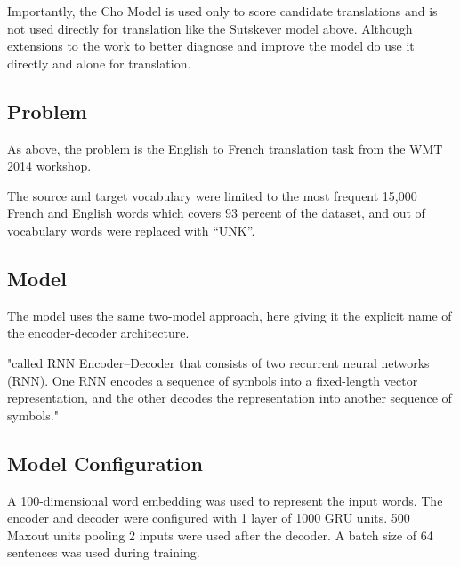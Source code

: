 \documentclass[10pt,a4paper]{article}
\begin{document}
	Importantly, the Cho Model is used only to score candidate translations and is not used directly for translation like the Sutskever model above. Although extensions to the work to better diagnose and improve the model do use it directly and alone for translation.
	
\subsection{Problem}
As above, the problem is the English to French translation task from the WMT 2014 workshop.

The source and target vocabulary were limited to the most frequent 15,000 French and English words which covers $93$ percent of the dataset, and out of vocabulary words were replaced with “UNK”.

\subsection{Model}

The model uses the same two-model approach, here giving it the explicit name of the encoder-decoder architecture.

"called RNN Encoder–Decoder that consists of two recurrent neural networks (RNN). One RNN encodes a sequence of symbols into a fixed-length vector representation, and the other decodes the representation into another sequence of symbols."

\subsection{Model Configuration}
A 100-dimensional word embedding was used to represent the input words.
The encoder and decoder were configured with 1 layer of 1000 GRU units.
500 Maxout units pooling 2 inputs were used after the decoder.
A batch size of 64 sentences was used during training.
\end{document}
